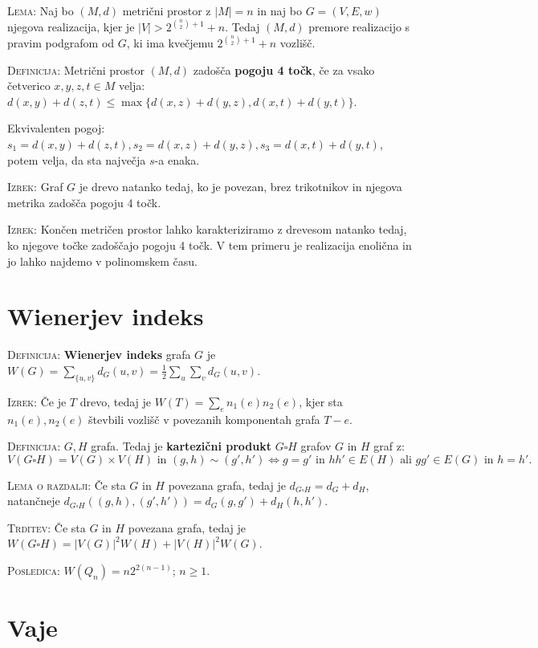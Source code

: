 \documentclass[8pt,a4paper]{amsart}
\theoremstyle{definition} %
\theoremstyle{plain} %
\begin{document}
\textsc{Lema:} Naj bo $(M,d)$ metrični prostor z $|M|=n$ in naj bo $G=(V,E,w)$
njegova realizacija, kjer je $|V| > 2^{\binom{n}{2}+1}+n$. Tedaj $(M,d)$ premore
realizacijo s pravim podgrafom od $G$, ki ima kvečjemu  $2^{\binom{n}{2}+1}+n$
vozlišč.

\textsc{Definicija:} Metrični prostor $(M,d)$ zadošča \textbf{pogoju 4 točk}, če
za vsako četverico $x,y,z,t \in M$ velja: $d(x,y)+d(z,t) \leq
\max{\{d(x,z)+d(y,z), d(x,t)+d(y,t)\}}$.

Ekvivalenten pogoj: $s_1 = d(x,y)+d(z,t), s_2 = d(x,z)+d(y,z), s_3=
d(x,t)+d(y,t)$, potem velja, da sta največja $s$-a enaka.

\textsc{Izrek:} Graf $G$ je drevo natanko tedaj, ko je povezan, brez trikotnikov
in njegova metrika zadošča pogoju 4 točk.

\textsc{Izrek:} Končen metričen prostor lahko karakteriziramo z drevesom natanko
tedaj, ko njegove točke zadoščajo pogoju 4 točk. V tem primeru je realizacija
enolična in jo lahko najdemo v polinomskem času.

\vspace{-2ex}
\section{Wienerjev indeks}

\textsc{Definicija:} \textbf{Wienerjev indeks} grafa $G$ je $W(G) =
\sum_{\{u,v\}}d_G(u,v) = \frac{1}{2}\sum_u \sum_v d_G(u,v)$.

\textsc{Izrek:} Če je $T$ drevo, tedaj je $W(T) = \sum_e n_1(e) n_2(e)$, kjer
sta $n_1(e), n_2(e)$ števbili vozlišč v povezanih komponentah grafa $T-e$.

\textsc{Definicija:} $G,H$ grafa. Tedaj je \textbf{kartezični produkt} $G
\square H$ grafov $G$ in $H$ graf z: $$ V(G \square H) = V(G) \times
V(H)\text{  in } (g,h) \sim (g',h') \Longleftrightarrow g=g' \text{ in } hh' \in
E(H) \text{ ali } gg' \in E(G) \text{ in } h=h'.  $$

\textsc{Lema o razdalji:} Če sta $G$ in $H$ povezana grafa, tedaj je $d_{G
\square H} = d_G + d_H$, natančneje $d_{G \square H}((g,h),(g',h')) =
d_G(g,g') + d_H(h,h')$.

\textsc{Trditev:} Če sta $G$ in $H$ povezana grafa, tedaj je $W(G\square H) =
|V(G)|^2W(H) + |V(H)|^2W(G)$.

\textsc{Posledica:} $W(Q_n) = n2^{2(n-1)}$; $n \geq 1$.

\vspace{-2ex}
\section{Vaje}
\end{document}

